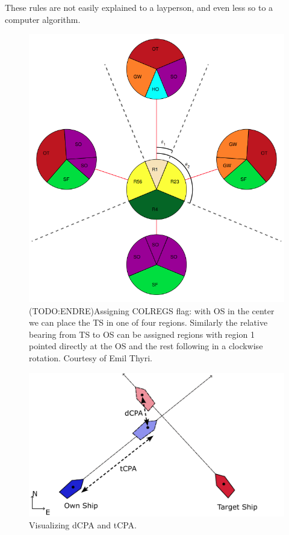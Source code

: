 These rules are not easily explained to a layperson, and even less so to a computer algorithm. 



\begin{figure} %
    \centering
    \includegraphics[height=0.5\textheight]{Images/COLREGs_assess.png}
    \caption{(TODO:ENDRE)Assigning COLREGS flag: with OS in the center we can place the TS in one of four regions. Similarly the relative bearing from TS to OS can be assigned regions with region 1 pointed directly at the OS and the rest following in a clockwise rotation.
    Courtesy of Emil Thyri.}
    \label{FIG: COLREGs Classification}
\end{figure}

\begin{figure}
    \centering
    \includegraphics[width=\textwidth]{Images/shipCPA.pdf}
    \caption{Visualizing dCPA and tCPA.}
    \label{FIG: ship CPA}
\end{figure}



